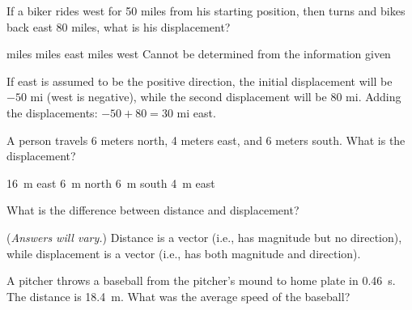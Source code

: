 \documentclass[answers]{exam}
\begin{document}
\begin{questions}
\begin{questions}


\question
If a biker rides west for 50 miles from his starting position, then turns and bikes back east 80 miles, what is his displacement?

\begin{choices}
 miles
 miles east
 miles west
\choice Cannot be determined from the information given
\end{choices}

\begin{solution}
If east is assumed to be the positive direction, the initial displacement will be $-50$ mi (west is negative), while the second displacement will be 80 mi. Adding the displacements: $-50 + 80 = 30$ mi east.
\end{solution}

\question
A person travels 6 meters north, 4 meters east, and 6 meters south. What is the displacement?

\begin{choices}
\choice \SI{16}{\meter} east
\choice \SI{6}{\meter} north
\choice \SI{6}{\meter} south
\CorrectChoice \SI{4}{\meter} east
\end{choices}

\question %
What is the difference between distance and displacement?

\begin{solution}
(\textit{Answers will vary.}) Distance is a vector (i.e., has magnitude but no direction), while displacement is a vector (i.e., has both magnitude and direction).
\end{solution}

\clearpage


\question
A pitcher throws a baseball from the pitcher's mound to home plate in \SI{0.46}{s}. The distance is \SI{18.4}{m}. What was the average speed of the baseball?


\end{questions}
\end{questions}
\end{document}
